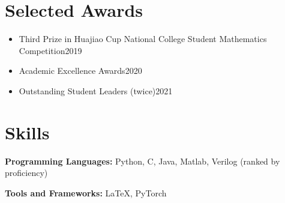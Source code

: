 \documentclass{resume}
\begin{document}
\section{Selected Awards}
\begin{itemize}
    \item Third Prize in Huajiao Cup National College Student Mathematics Competition\hfill 2019
    \item Academic Excellence Awards\hfill 2020
    \item Outstanding Student Leaders (twice)\hfill 2021
\end{itemize}

\section{Skills}
\textbf{Programming Languages:} \small Python, C, Java, Matlab, Verilog (ranked by proficiency)

\textbf{Tools and Frameworks:} \small \LaTeX, PyTorch
\end{document}
